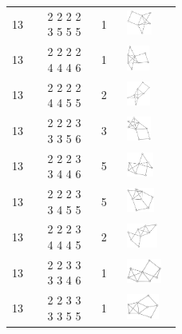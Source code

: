 \begin{footnotesize}
\begin{longtable}{m{0.07\linewidth} m{0.15\linewidth} m{0.05\linewidth} m{0.15\linewidth}}
13 & 2 2 2 2 3 5 5 5 & 1 & \includegraphics[height=0.8cm]{15-universal-graphs/img/degree-sequences-example-graphs/graph-4-8-52}\\
13 & 2 2 2 2 4 4 4 6 & 1 & \includegraphics[height=0.8cm]{15-universal-graphs/img/degree-sequences-example-graphs/graph-4-8-53}\\
13 & 2 2 2 2 4 4 5 5 & 2 & \includegraphics[height=0.8cm]{15-universal-graphs/img/degree-sequences-example-graphs/graph-4-8-54}\\
13 & 2 2 2 3 3 3 5 6 & 3 & \includegraphics[height=0.8cm]{15-universal-graphs/img/degree-sequences-example-graphs/graph-4-8-55}\\
13 & 2 2 2 3 3 4 4 6 & 5 & \includegraphics[height=0.8cm]{15-universal-graphs/img/degree-sequences-example-graphs/graph-4-8-56}\\
13 & 2 2 2 3 3 4 5 5 & 5 & \includegraphics[height=0.8cm]{15-universal-graphs/img/degree-sequences-example-graphs/graph-4-8-57}\\
13 & 2 2 2 3 4 4 4 5 & 2 & \includegraphics[height=0.8cm]{15-universal-graphs/img/degree-sequences-example-graphs/graph-4-8-58}\\
13 & 2 2 3 3 3 3 4 6 & 1 & \includegraphics[height=0.8cm]{15-universal-graphs/img/degree-sequences-example-graphs/graph-4-8-59}\\
13 & 2 2 3 3 3 3 5 5 & 1 & \includegraphics[height=0.8cm]{15-universal-graphs/img/degree-sequences-example-graphs/graph-4-8-60}\\

\end{longtable}
\end{footnotesize}
